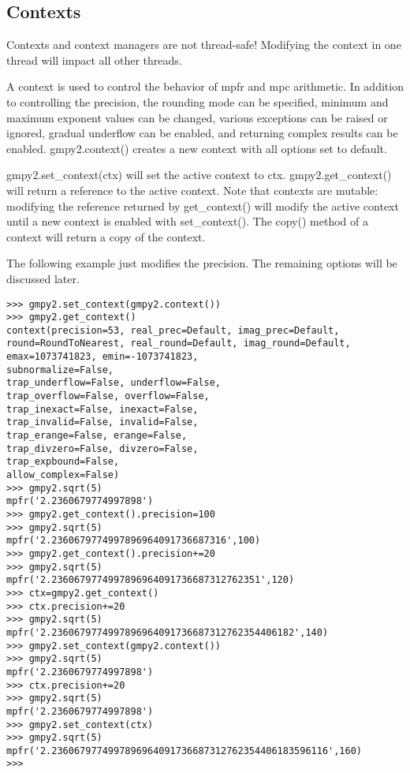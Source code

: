 \subsection{Contexts}

Contexts and context managers are not thread-safe! Modifying the context in one thread
will impact all other threads.

\vpara
A context is used to control the behavior of mpfr and mpc arithmetic. In addition to
controlling the precision, the rounding mode can be specified, minimum and maximum
exponent values can be changed, various exceptions can be raised or ignored, gradual
underflow can be enabled, and returning complex results can be enabled.
gmpy2.context() creates a new context with all options set to default.

\vpara
gmpy2.set\_context(ctx) will set the active context to ctx. gmpy2.get\_context() will
return a reference to the active context. Note that contexts are mutable: modifying the
reference returned by get\_context() will modify the active context until a new context is
enabled with set\_context(). The copy() method of a context will return a copy of the
context.

\vpara
The following example just modifies the precision. The remaining options will be discussed
later.

\begin{lstlisting}
>>> gmpy2.set_context(gmpy2.context())
>>> gmpy2.get_context()
context(precision=53, real_prec=Default, imag_prec=Default,
round=RoundToNearest, real_round=Default, imag_round=Default,
emax=1073741823, emin=-1073741823,
subnormalize=False,
trap_underflow=False, underflow=False,
trap_overflow=False, overflow=False,
trap_inexact=False, inexact=False,
trap_invalid=False, invalid=False,
trap_erange=False, erange=False,
trap_divzero=False, divzero=False,
trap_expbound=False,
allow_complex=False)
>>> gmpy2.sqrt(5)
mpfr('2.2360679774997898')
>>> gmpy2.get_context().precision=100
>>> gmpy2.sqrt(5)
mpfr('2.2360679774997896964091736687316',100)
>>> gmpy2.get_context().precision+=20
>>> gmpy2.sqrt(5)
mpfr('2.2360679774997896964091736687312762351',120)
>>> ctx=gmpy2.get_context()
>>> ctx.precision+=20
>>> gmpy2.sqrt(5)
mpfr('2.2360679774997896964091736687312762354406182',140)
>>> gmpy2.set_context(gmpy2.context())
>>> gmpy2.sqrt(5)
mpfr('2.2360679774997898')
>>> ctx.precision+=20
>>> gmpy2.sqrt(5)
mpfr('2.2360679774997898')
>>> gmpy2.set_context(ctx)
>>> gmpy2.sqrt(5)
mpfr('2.2360679774997896964091736687312762354406183596116',160)
>>>
\end{lstlisting}


